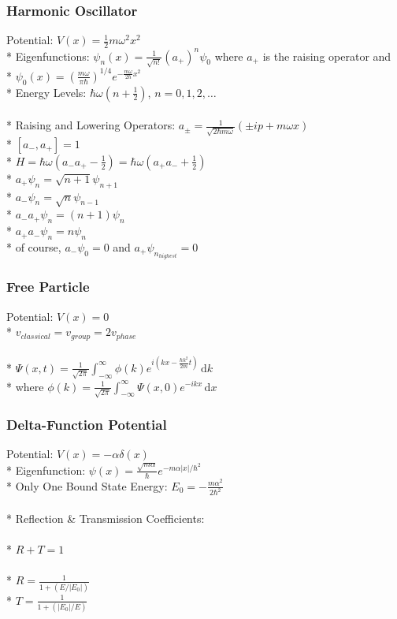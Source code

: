 \subsubsection{Harmonic Oscillator}
Potential: \(V(x)=\frac{1}{2}m\omega^2x^2\)\\*
Eigenfunctions: \(\psi_n(x)=\frac{1}{\sqrt{n!}}(a_+)^n\psi_0\) where \(a_+\) is the raising operator and\\*
\(\displaystyle\psi_0(x)=\left(\frac{m\omega}{\pi\hbar}\right)^{1/4}e^{-\frac{m\omega}{2\hbar}x^2}\)\\*
Energy Levels: \(\displaystyle\hbar\omega\left(n+\frac{1}{2}\right)\),  \(n=0,1,2,\ldots\)\\\\*
Raising and Lowering Operators: \(a_{\pm}=\frac{1}{\sqrt{2\hbar m\omega}}(\pm ip+m\omega x)\)\\*
\([a_-,a_+]=1\)\\*
\(H=\hbar\omega\left(a_-a_+-\frac{1}{2}\right)=\hbar\omega\left(a_+a_-+\frac{1}{2}\right)\)\\*
\(a_+\psi_n=\sqrt{n+1}\psi_{n+1}\)\\*
\(a_-\psi_n=\sqrt{n}\psi_{n-1}\)\\*
\(a_-a_+\psi_n=(n+1)\psi_{n}\)\\*
\(a_+a_-\psi_n=n\psi_{n}\)\\*
of course, \(a_-\psi_0=0\) and \(a_+\psi_{n_{highest}}=0\)

\subsubsection{Free Particle}
Potential: \(V(x)=0\)\\*
\(v_{classical}=v_{group}=2v_{phase}\)\\\\*
\(\displaystyle\Psi(x,t)=\frac{1}{\sqrt{2\pi}}\int_{-\infty}^{\infty}\phi(k)e^{i(kx-\frac{\hbar k^2}{2m}t)}\,\mathrm{d}k\)\\*
where \(\displaystyle\phi(k)=\frac{1}{\sqrt{2\pi}}\int_{-\infty}^{\infty}\Psi(x,0)e^{-ikx}\,\mathrm{d}x\)

\subsubsection{Delta-Function Potential}
Potential: \(V(x)=-\alpha\delta(x)\)\\*
Eigenfunction: \(\displaystyle\psi(x)=\frac{\sqrt{m\alpha}}{\hbar}e^{-m\alpha|x|/\hbar^2}\)\\*
Only One Bound State Energy: \(\displaystyle E_0=-\frac{m\alpha^2}{2\hbar^2}\)\\\\*
Reflection \& Transmission Coefficients:\\\\*
\(R+T=1\)\\\\*
\(\displaystyle R=\frac{1}{1+(E/|E_0|)}\)\\*
\(\displaystyle T=\frac{1}{1+(|E_0|/E)}\)


